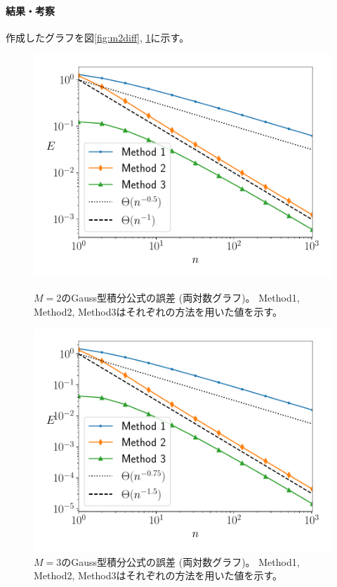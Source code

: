 \documentclass[a4j, titlepage]{jsarticle}
\numberwithin{equation}{section}
\begin{document}
            \paragraph{結果・考察}
                作成したグラフを図\ref{fig:m2diff}, \ref{fig:m3diff}に示す。
                \begin{figure}[h]
                    \begin{minipage}{0.49\hsize}
                        \centering
                        \includegraphics[width=1\hsize]{kadai3/2/2.pdf}
                        \caption{
                            $M=2$のGauss型積分公式の誤差 (両対数グラフ)。
                            Method1, Method2, Method3はそれぞれの方法を用いた値を示す。
                        }
                        \label{fig:m2diff}
                    \end{minipage}
                    \begin{minipage}{0.49\hsize}
                        \centering
                        \includegraphics[width=1\hsize]{kadai3/2/3.pdf}
                        \caption{
                            $M=3$のGauss型積分公式の誤差 (両対数グラフ)。
                            Method1, Method2, Method3はそれぞれの方法を用いた値を示す。
                        }
                        \label{fig:m3diff}
                    \end{minipage}
                \end{figure}
\end{document}
